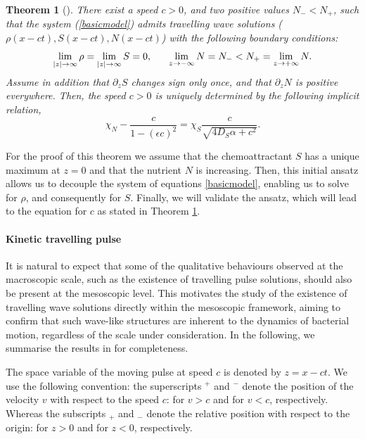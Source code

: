\documentclass[11pt,twoside]{article}
\theoremstyle{plain}
\newtheorem{theorem}{Theorem}[section]
\theoremstyle{nonumberplain}
\begin{document}
\begin{theorem}[\cite{calvez2016chemotactic}]\label{thmacro}
There exist a speed $c>0$, and two positive values $N_- < N_+$, such that the system (\ref{basicmodel}) admits travelling wave solutions ($\rho (x- c t), S(x - c t), N(x - c t)$) with the following boundary conditions:
\begin{equation}
    \lim_{|z| \to \infty} \rho = \lim_{|z| \to \infty} S = 0, \hspace{0.6cm} \lim_{z \to -\infty} N = N_- < N_+ = \lim_{z \to + \infty} N.
    \nonumber
\end{equation}
Assume in addition that $\partial_z S$ changes sign only once, and that $\partial_z N$ is positive everywhere. Then, the speed $c > 0$ is uniquely determined by the following implicit relation,
\[
\chi_N - \frac{c}{1 - (\epsilon c)^2} = \chi_S \frac{c}{\sqrt{4 D_S \alpha + c^2}}.
\]
\end{theorem}

For the proof of this theorem we assume that the chemoattractant $S$ has a unique maximum at $z = 0$ and that the nutrient $N$ is increasing. Then, this initial ansatz allows us to decouple the system of equations \eqref{basicmodel}, enabling us to solve for $\rho$, and consequently for $S$. Finally, we will validate the ansatz, which will lead to the equation for $c$ as stated in Theorem \ref{thmacro}.

\paragraph{Kinetic travelling pulse} It is natural to expect that some of the qualitative behaviours observed at the macroscopic scale, such as the existence of travelling pulse solutions, should also be present at the mesoscopic level. This motivates the study of the existence of travelling wave solutions directly within the mesoscopic framework, aiming to confirm that such wave-like structures are inherent to the dynamics of bacterial motion, regardless of the scale under consideration.
In the following, we summarise the results in \cite{calvez2016chemotactic} for completeness.

The space variable of the moving pulse at speed $c$ is denoted by $z = x-ct$.
We use the following convention: the superscripts $^+$ and $^-$ denote the position of the velocity $v$ with respect to the speed $c$: for $v>c$ and for $v<c$, respectively. Whereas the subscripts $_+$ and $_-$ denote the relative position with respect to the origin: for $z>0$ and for $z<0$, respectively. 
\end{document}
